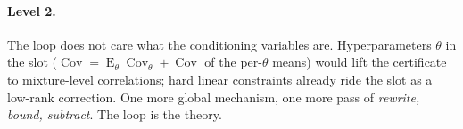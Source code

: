 \documentclass[11pt]{article}
\theoremstyle{remark}
\newcommand{\Cov}{\operatorname{Cov}}
\newcommand{\E}{\operatorname{E}}
\begin{document}
\paragraph{Level 2.}  The loop does not care what the conditioning
variables are.  Hyperparameters $\theta$ in the slot
($\Cov = \E_\theta\Cov_\theta + \Cov$ of the per-$\theta$ means) would
lift the certificate to mixture-level correlations; hard linear
constraints already ride the slot as a low-rank correction.  One more
global mechanism, one more pass of \emph{rewrite, bound, subtract}.
The loop is the theory.
\end{document}
